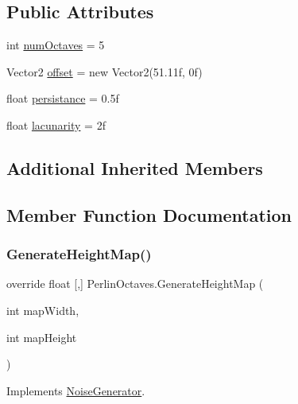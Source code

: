 \subsection*{Public Attributes}
\begin{DoxyCompactItemize}
\item 
int \mbox{\hyperlink{class_perlin_octaves_a611e17877eb36a3bdb546feae4d512cf}{num\+Octaves}} = 5
\item 
Vector2 \mbox{\hyperlink{class_perlin_octaves_a86b7b4fa2c1f94e01a37748511ddb8ee}{offset}} = new Vector2(51.\+11f, 0f)
\item 
float \mbox{\hyperlink{class_perlin_octaves_a0568ba2145fef1efb6bb137df4055a8a}{persistance}} = 0.\+5f
\item 
float \mbox{\hyperlink{class_perlin_octaves_a77574e7d920b80d15916798a4a7900d7}{lacunarity}} = 2f
\end{DoxyCompactItemize}
\subsection*{Additional Inherited Members}


\subsection{Member Function Documentation}
\mbox{\label{class_perlin_octaves_ac5deb001801dbfe9666df3dea023ce7a}} 
\subsubsection{\texorpdfstring{Generate\+Height\+Map()}{GenerateHeightMap()}}
{\footnotesize\ttfamily override float \mbox{[},\mbox{]} Perlin\+Octaves.\+Generate\+Height\+Map (\begin{DoxyParamCaption}\item[{int}]{map\+Width,  }\item[{int}]{map\+Height }\end{DoxyParamCaption})\hspace{0.3cm}{\ttfamily [virtual]}}



Implements \mbox{\hyperlink{class_noise_generator_a1d3983a9ad33c2734f373e9f2d8f13d7}{Noise\+Generator}}.

\mbox{\label{class_perlin_octaves_acb953d3791014b27123139aee969f9bd}} 
